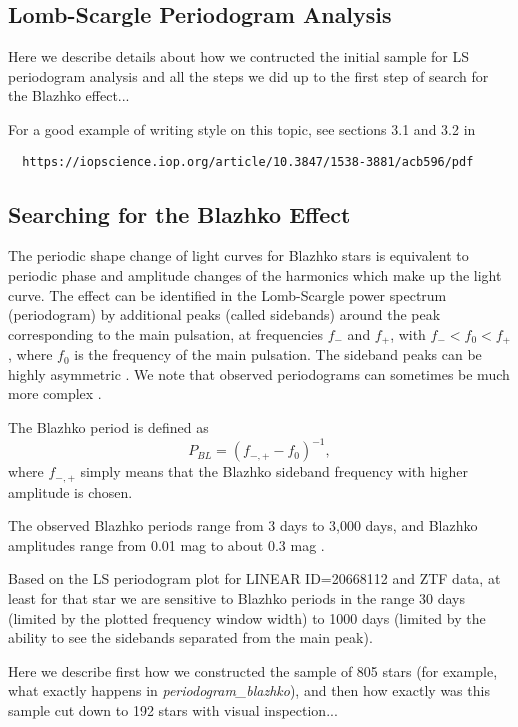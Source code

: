 \subsection{Lomb-Scargle Periodogram Analysis}

Here we describe details about how we contructed the initial sample for LS periodogram analysis and all the
steps we did up to the first step of search for the Blazhko effect... 

For a good example of writing style on this topic, see sections 3.1 and 3.2 in
\begin{verbatim}
  https://iopscience.iop.org/article/10.3847/1538-3881/acb596/pdf
\end{verbatim}

\subsection{Searching for the Blazhko Effect}

The periodic shape change of light curves for Blazhko stars is equivalent to periodic phase and amplitude changes of the
harmonics which make up the light curve. The effect can be identified in the Lomb-Scargle power spectrum (periodogram)
by additional peaks (called sidebands) around the peak corresponding to the main pulsation, at frequencies $f_-$ and $f_+$,
with $f_- < f_0 < f_+$, where $f_0$ is the frequency of the main pulsation. The sideband peaks can be highly asymmetric
\cite{2003ApJ...598..597A}. We note that observed periodograms can sometimes be much more complex \cite{2007MNRAS.377.1263S}. 

The Blazhko period is defined as
\begin{equation}
  P_{BL} = (f_{-,+} - f_0)^{-1},
\end{equation}
where $f_{-,+}$ simply means that the Blazhko sideband frequency with higher amplitude is chosen. 

The observed Blazhko periods range from 3 days to 3,000 days, and Blazhko amplitudes range from 0.01 mag to about 0.3 mag \citep{2007MNRAS.377.1263S}.


%

Based on the LS periodogram plot for LINEAR ID=20668112 and ZTF data, at least for that star we are
sensitive to Blazhko periods in the range 30 days (limited by the plotted frequency window width) to
1000 days (limited by the ability to see the sidebands separated from the main peak). 


Here we describe first how we constructed the sample of 805 stars (for example, what exactly happens in
{\it periodogram\_blazhko}), and then how exactly was this sample cut down to 192 stars with visual inspection... 